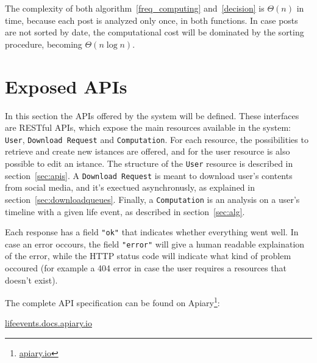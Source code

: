 The complexity of both algorithm~\ref{freq_computing} and~\ref{decision} is $\Theta(n)$ in time, because each post is analyzed only once, in both functions. In case posts are not sorted by date, the computational cost will be dominated by the sorting procedure, becoming $\Theta(n \log n)$.

\section{Exposed APIs}
\label{sec:APIs}

In this section the APIs offered by the system will be defined. These interfaces are RESTful APIs, which expose the main resources available in the system: \texttt{User}, \texttt{Download Request} and \texttt{Computation}. For each resource, the possibilities to retrieve and create new istances are offered, and for the user resource is also possible to edit an istance. The structure of the \texttt{User} resource is described in section~\ref{sec:apis}. A \texttt{Download Request} is meant to download user's contents from social media, and it's exectued asynchronusly, as explained in section~\ref{sec:downloadqueues}. Finally, a \texttt{Computation} is an analysis on a user's timeline with a given life event, as described in section~\ref{sec:alg}.

Each response has a field \texttt{"ok"} that indicates whether everything went well. In case an error occours, the field \texttt{"error"} will give a human readable explaination of the error, while the HTTP status code will indicate what kind of problem occoured (for example a 404 error in case the user requires a resources that doesn't exist).

The complete API specification can be found on Apiary\footnote{\url{apiary.io}}:
\begin{center}
\url{lifeevents.docs.apiary.io}
\end{center}

